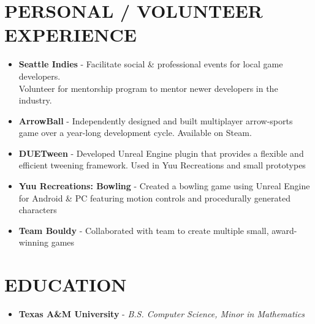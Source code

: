 \documentclass[resmargin,10pt]{res} %
\begin{document}
\begin{resume}
    \section{PERSONAL / VOLUNTEER EXPERIENCE}
    \begin{itemize}
        \setlength\itemsep{-0.0em}
        \item \textbf{Seattle Indies} - Facilitate social \& professional events for local game developers. \\Volunteer for mentorship program to mentor newer developers in the industry.
        \item \textbf{ArrowBall} - Independently designed and built multiplayer arrow-sports game over a year-long development cycle. Available on Steam.
        \item \textbf{DUETween} - Developed Unreal Engine plugin that provides a flexible and efficient tweening framework. Used in Yuu Recreations and small prototypes
        \item \textbf{Yuu Recreations: Bowling} - Created a bowling game using Unreal Engine for Android \& PC featuring motion controls and procedurally generated characters
        \item \textbf{Team Bouldy} - Collaborated with team to create multiple small, award-winning games
    \end{itemize}

    \section{EDUCATION}
    \begin{itemize}
        \setlength\itemsep{0.1em}
        \item[] {\bf Texas A\&M University} - \textit{B.S. Computer Science, Minor in Mathematics}
    \end{itemize}
\end{resume}
\end{document}
